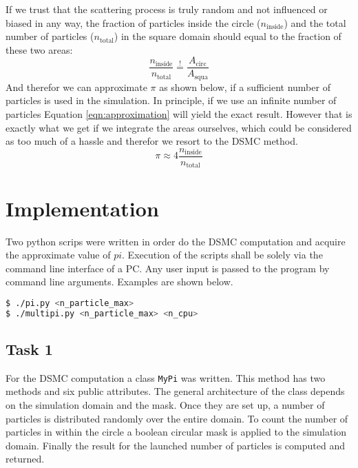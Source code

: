\documentclass{aa}
\begin{document}
If we trust that the scattering process is truly random and not influenced or biased in any
way, the fraction of particles inside the circle (\(n_\mathrm{inside}\)) and the total number
of particles (\(n_\mathrm{total}\)) in the square domain should equal to the fraction of these
two areas:
\begin{equation}
    \label{eqn:fractions}
    \frac{n_\mathrm{inside}}{n_\mathrm{total}} \overset{!}{=}
    \frac{A_\mathrm{circ}}{A_\mathrm{squa}}
\end{equation}
And therefor we can approximate \(\pi\) as shown below, if a sufficient number of particles is
used in the simulation. In principle, if we use an infinite number of particles Equation
\ref{eqn:approximation} will yield the exact result. However that is exactly what we get if we
integrate the areas ourselves, which could be considered as too much of a hassle and therefor
we resort to the DSMC method.
\begin{equation}
    \label{eqn:approximation}
    \pi \approx 4 \frac{n_\mathrm{inside}}{n_\mathrm{total}}
\end{equation}

\section{Implementation}%
\label{sec:implementation}

Two python scrips were written in order do the DSMC computation and acquire the approximate
value of \(pi\). Execution of the scripts shall be solely via the command line interface of a
PC. Any user input is passed to the program by command line arguments. Examples are shown
below.
\begin{lstlisting}[language=bash, numbers=none]
$ ./pi.py <n_particle_max>
$ ./multipi.py <n_particle_max> <n_cpu>
\end{lstlisting}

\subsection{Task 1}%
\label{sub:task_1}
For the DSMC computation a class \verb+MyPi+ was written. This method has two methods and six
public attributes. The general architecture of the class depends on the simulation domain and
the mask. Once they are set up, a number of particles is distributed randomly over the entire
domain. To count the number of particles in within the circle a boolean circular mask is
applied to the simulation domain. Finally the result for the launched number of particles is
computed and returned.
\end{document}
